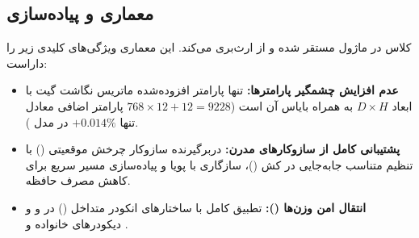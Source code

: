 \subsection{معماری و پیاده‌سازی}
کلاس  در ماژول  مستقر شده و از  ارث‌بری می‌کند. این معماری ویژگی‌های کلیدی زیر را داراست:
\begin{itemize}
    \item \textbf{عدم افزایش چشمگیر پارامترها:} تنها پارامتر افزوده‌شده ماتریس نگاشت گیت با ابعاد $D \times H$ به همراه بایاس آن است ($768 \times 12 + 12 = 9228$ پارامتر اضافی معادل تنها $+0.014\%$ در مدل ).
    \item \textbf{پشتیبانی کامل از سازوکارهای مدرن:} دربرگیرنده سازوکار چرخش موقعیتی () با تنظیم متناسب جابه‌جایی در کش ()، سازگاری با  پویا و پیاده‌سازی مسیر سریع  برای کاهش مصرف حافظه.
    \item \textbf{انتقال امن وزن‌ها ():} تطبیق کامل با ساختارهای انکودر متداخل () در  و  و دیکودرهای خانواده  و .
\end{itemize}
